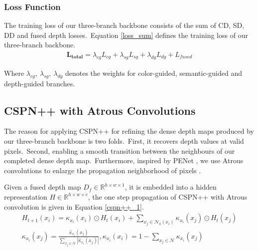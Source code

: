 \documentclass{ieeeaccess}
\begin{document}
\subsubsection{Loss Function}
The training loss of our three-branch backbone consists of the sum of CD, SD, DD and fused depth losses.~Equation \ref{loss_sum} defines the training loss of our three-branch backbone.
\begin{equation}
    \begin{aligned}
            \mathbf{L_{total}} =  \lambda_{cg}L_{cg} + \lambda_{sg}L_{sg} + \lambda_{dg}L_{dg} + L_{fused}   
    \end{aligned}
    \label{loss_sum}
\end{equation}

Where $\lambda_{cg}, \ \lambda_{sg}, \ \lambda_{dg}$ denotes the weights for color-guided, semantic-guided and depth-guided branches.




\subsection{CSPN++ with Atrous Convolutions}

The reason for applying CSPN++ for refining the dense depth maps produced by our three-branch backbone is two folds.~First, it recovers depth values at valid pixels.~Second, enabling a smooth transition between the neighbours of our completed dense depth map.~Furthermore, inspired by PENet \cite{hu2020PENet}, we use Atrous convolutions \cite{yu2016multiscale} to enlarge the propagation neighborhood of pixels \cite{xu2020deformable}.

Given a fused depth map $D_{f} \in \mathbb{R}^{h \times w \times 1}$, it is embedded into a hidden representation $H \in \mathbb{R}^{h \times w \times c}$, the one step propagation of CSPN++ with Atrous convolution is given in Equation \ref{cspn++_1}.
\begin{equation}
\begin{gathered}
    H_{t+1}(x_{i}) =\kappa_{x_{i}}\left(x_{i}\right) \odot H_{t}\left(x_{i}\right)+\sum_{x_{j} \in \mathcal{N}_{k}(x_i)}\kappa_{x_{i}}(x_{j}) \odot H_{t}(x_{j})\\
    \kappa_{x_{i}}\left(x_{j}\right)=\frac{\hat{\kappa}_{x_{i}}\left(x_{j}\right)}{\sum_{x_{j} \in \mathcal{N}}\left|\hat{\kappa}_{x_{i}}\left(x_{j}\right)\right|}, \kappa_{x_{i}}\left(x_{i}\right)=1-\sum_{x_{j} \in \mathcal{N}} \kappa_{x_{i}}\left(x_{j}\right)
\end{gathered}
\label{cspn++_1}
\end{equation}
\end{document}
